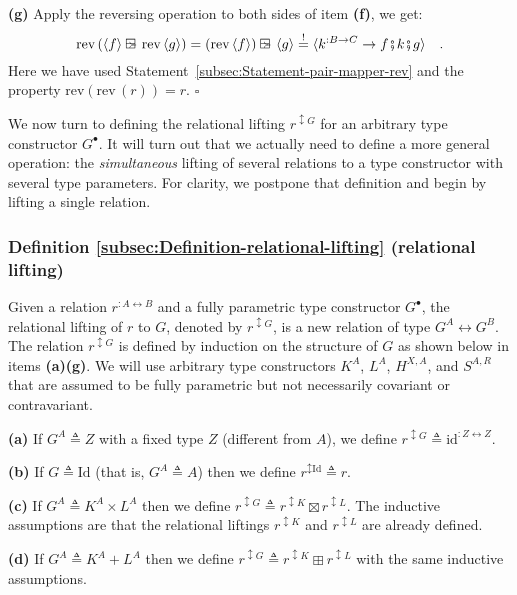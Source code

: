 \textbf{(g)} Apply the reversing operation to both sides of item \textbf{(f)},
we get:
\[
\text{rev}\,(\left<f\right>\ogreaterthan\text{rev}\left<g\right>)=(\text{rev}\left<f\right>)\ogreaterthan\left<g\right>\overset{!}{=}\langle k^{:B\rightarrow C}\rightarrow f\bef k\bef g\rangle\quad.
\]
Here we have used Statement~\ref{subsec:Statement-pair-mapper-rev}
and the property $\text{rev}\left(\text{rev}\,(r)\right)=r$. $\square$

We now turn to defining the relational lifting $r^{\updownarrow G}$
for an arbitrary type constructor $G^{\bullet}$. It will turn out
that we actually need to define a more general operation: the \emph{simultaneous}
lifting of several relations to a type constructor with several type
parameters. For clarity, we postpone that definition and begin by
lifting a single relation.

\subsubsection{Definition \label{subsec:Definition-relational-lifting}\ref{subsec:Definition-relational-lifting}
(relational lifting)}

Given a relation $r^{:A\leftrightarrow B}$ and a fully parametric
type constructor $G^{\bullet}$, the relational lifting of $r$ to
$G$, denoted by $r^{\updownarrow G}$, is a new relation of type
$G^{A}\leftrightarrow G^{B}$. The relation $r^{\updownarrow G}$
is defined by induction on the structure of $G$ as shown below in
items \textbf{(a)}\textendash \textbf{(g)}. We will use arbitrary
type constructors $K^{A}$, $L^{A}$, $H^{X,A}$, and $S^{A,R}$ that
are assumed to be fully parametric but not necessarily covariant or
contravariant. 

\textbf{(a)} If $G^{A}\triangleq Z$ with a fixed type $Z$ (different
from $A$), we define $r^{\updownarrow G}\triangleq\text{id}^{:Z\leftrightarrow Z}$.

\textbf{(b)} If $G\triangleq\text{Id}$ (that is, $G^{A}\triangleq A$)
then we define $r^{\updownarrow\text{Id}}\triangleq r$. 

\textbf{(c)} If $G^{A}\triangleq K^{A}\times L^{A}$ then we define
$r^{\updownarrow G}\triangleq r^{\updownarrow K}\boxtimes r^{\updownarrow L}$.
The inductive assumptions are that the relational liftings $r^{\updownarrow K}$
and $r^{\updownarrow L}$ are already defined.

\textbf{(d)} If $G^{A}\triangleq K^{A}+L^{A}$ then we define $r^{\updownarrow G}\triangleq r^{\updownarrow K}\boxplus r^{\updownarrow L}$
with the same inductive assumptions.

